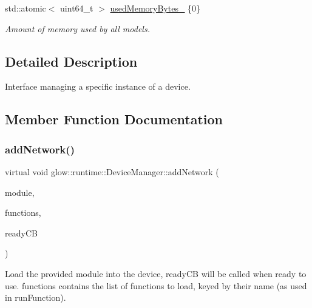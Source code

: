 \begin{DoxyCompactItemize}
\mbox{\label{classglow_1_1runtime_1_1_device_manager_a37380c1f168e833e9382e6560866be19}} 
std\+::atomic$<$ uint64\+\_\+t $>$ \hyperlink{classglow_1_1runtime_1_1_device_manager_a37380c1f168e833e9382e6560866be19}{used\+Memory\+Bytes\+\_\+} \{0\}
\begin{DoxyCompactList}\small\item\em Amount of memory used by all models. \end{DoxyCompactList}\end{DoxyCompactItemize}


\subsection{Detailed Description}
Interface managing a specific instance of a device. 

\subsection{Member Function Documentation}
\mbox{\label{classglow_1_1runtime_1_1_device_manager_a9bbf9a88f8bf9ddc0ce63590580aa91f}} 
\subsubsection{\texorpdfstring{add\+Network()}{addNetwork()}}
{\footnotesize\ttfamily virtual void glow\+::runtime\+::\+Device\+Manager\+::add\+Network (\begin{DoxyParamCaption}\item[{const \hyperlink{classglow_1_1_module}{Module} $\ast$}]{module,  }\item[{Function\+Map\+Ty}]{functions,  }\item[{Ready\+C\+B\+Ty}]{ready\+CB }\end{DoxyParamCaption})\hspace{0.3cm}{\ttfamily [pure virtual]}}

Load the provided module into the device, ready\+CB will be called when ready to use. {\ttfamily functions} contains the list of functions to load, keyed by their name (as used in run\+Function). 

